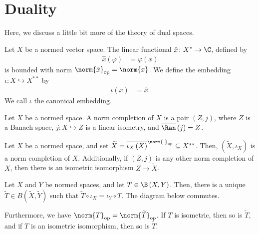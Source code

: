 \section{Duality}%
Here, we discuss a little bit more of the theory of dual spaces.
\begin{definition}\label{def:double_dual_and_canonical_embedding}
  Let $X$ be a normed vector space. The linear functional $\hat{x}\colon X^{\ast}\rightarrow \C$, defined by
  \begin{align*}
    \hat{x}(\varphi) &= \varphi(x)
  \end{align*}
  is bounded with norm $\norm{\hat{x}}_{\op} = \norm{x}$. We define the embedding $\iota\colon X\hookrightarrow X^{\ast\ast}$ by
  \begin{align*}
    \iota(x) &= \hat{x}.
  \end{align*}
  We call $\iota$ the canonical embedding.
\end{definition}
\begin{definition}
  Let $X$ be a normed space. A norm completion of $X$ is a pair $\left(Z,j\right)$, where $Z$ is a Banach space, $j\colon X\hookrightarrow Z$ is a linear isometry, and $\overline{\Ran}\left(j\right) = Z$.
\end{definition}
\begin{proposition}
  Let $X$ be a normed space, and set $\widetilde{X} = \overline{\iota_X\left(X\right)}^{\norm{\cdot}_{\op}}\subseteq X^{\ast\ast}$. Then, $\left(\widetilde{X},\iota_X\right)$ is a norm completion of $X$. Additionally, if $\left(Z,j\right)$ is any other norm completion of $X$, then there is an isometric isomorphism $Z\rightarrow \widetilde{X}$.
\end{proposition}
\begin{proposition}
  Let $X$ and $Y$ be normed spaces, and let $T\in \B\left(X,Y\right)$. Then, there is a unique $\widetilde{T}\in B\left(\widetilde{X},\widetilde{Y}\right)$ such that $\widetilde{T}\circ \iota_X = \iota_Y\circ T$. The diagram below commutes.
  \begin{center}
  \end{center}
  Furthermore, we have $\norm{T}_{\op} = \norm{\widetilde{T}}_{\op}$. If $T$ is isometric, then so is $\widetilde{T}$, and if $T$ is an isometric isomorphism, then so is $\widetilde{T}$.
\end{proposition}
